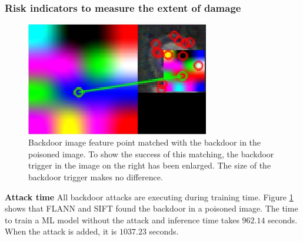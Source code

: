 \subsubsection*{Risk indicators to measure the extent of damage}

\begin{figure}[ht!]
  \centering
  \includegraphics[width=8cm]{pictures/feature_match.jpg}
  \caption{Backdoor image feature point matched with the backdoor in the poisoned image. To show the success of this matching, the backdoor trigger in the image on the right has been enlarged. The size of the backdoor trigger makes no difference.}
  \label{fig:feature_match}
\end{figure}

\textbf{Attack time} All backdoor attacks are executing during training time. Figure \ref{fig:feature_match} shows that FLANN and SIFT found the backdoor in a poisoned image. The time to train a ML model without the attack and inference time takes $962.14$ seconds. When the attack is added, it is $1037.23$ seconds.

